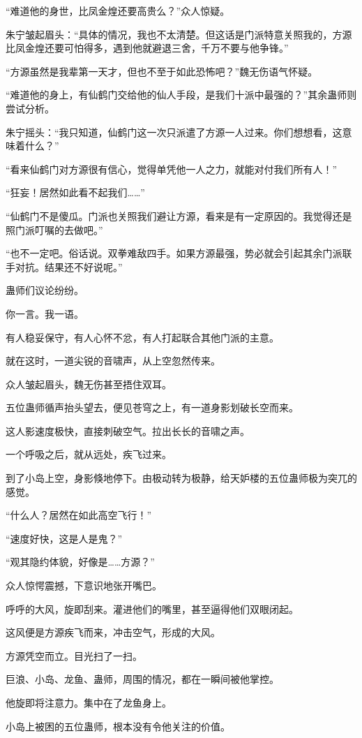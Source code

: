 \begin{this_body}
“难道他的身世，比凤金煌还要高贵么？”众人惊疑。

朱宁皱起眉头：“具体的情况，我也不太清楚。但这话是门派特意关照我的，方源比凤金煌还要可怕得多，遇到他就避退三舍，千万不要与他争锋。”

“方源虽然是我辈第一天才，但也不至于如此恐怖吧？”魏无伤语气怀疑。

“难道他的身上，有仙鹤门交给他的仙人手段，是我们十派中最强的？”其余蛊师则尝试分析。

朱宁摇头：“我只知道，仙鹤门这一次只派遣了方源一人过来。你们想想看，这意味着什么？”

“看来仙鹤门对方源很有信心，觉得单凭他一人之力，就能对付我们所有人！”

“狂妄！居然如此看不起我们……”

“仙鹤门不是傻瓜。门派也关照我们避让方源，看来是有一定原因的。我觉得还是照门派叮嘱的去做吧。”

“也不一定吧。俗话说。双拳难敌四手。如果方源最强，势必就会引起其余门派联手对抗。结果还不好说呢。”

蛊师们议论纷纷。

你一言。我一语。

有人稳妥保守，有人心怀不忿，有人打起联合其他门派的主意。

就在这时，一道尖锐的音啸声，从上空忽然传来。

众人皱起眉头，魏无伤甚至捂住双耳。

五位蛊师循声抬头望去，便见苍穹之上，有一道身影划破长空而来。

这人影速度极快，直接刺破空气。拉出长长的音啸之声。

一个呼吸之后，就从远处，疾飞过来。

到了小岛上空，身影倏地停下。由极动转为极静，给天妒楼的五位蛊师极为突兀的感觉。

“什么人？居然在如此高空飞行！”

“速度好快，这是人是鬼？”

“观其隐约体貌，好像是……方源？”

众人惊愕震撼，下意识地张开嘴巴。

呼呼的大风，旋即刮来。灌进他们的嘴里，甚至逼得他们双眼闭起。

这风便是方源疾飞而来，冲击空气，形成的大风。

方源凭空而立。目光扫了一扫。

巨浪、小岛、龙鱼、蛊师，周围的情况，都在一瞬间被他掌控。

他旋即将注意力。集中在了龙鱼身上。

小岛上被困的五位蛊师，根本没有令他关注的价值。


\end{this_body}

